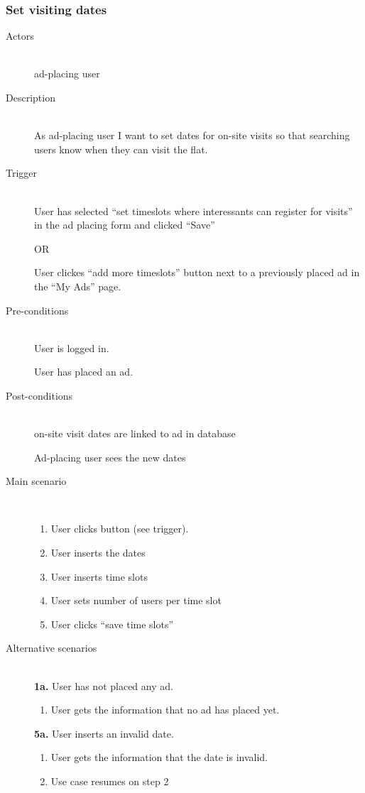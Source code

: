 \documentclass[a4wide]{article}
\begin{document}
\subsubsection{Set visiting dates}
\begin{description}
\item[Actors]\mbox{}\\
ad-placing user

\item[Description]\mbox{}\\
As ad-placing user I want to set dates for on-site visits so that searching users know when they can visit the flat.
\item[Trigger]\mbox{}\\
User has selected “set timeslots where interessants can register for visits” in the ad placing form and clicked  “Save”

OR

User clickes “add more timeslots” button next to a previously placed ad in the “My Ads” page.

\item[Pre-conditions]\mbox{}\\
User is logged in.

User has placed an ad.

\item[Post-conditions]\mbox{}\\
on-site visit dates are linked to ad in database

Ad-placing user sees the new dates

\item[Main scenario]\mbox{}\\
\begin{enumerate}
\item User clicks button (see trigger).
\item User inserts the dates
\item User inserts time slots
\item User sets number of users per time slot
\item User clicks “save time slots”
\end{enumerate}
\item[Alternative scenarios]\mbox{}\\
\textbf{1a.}  User has not placed any ad.
\begin{enumerate}
 \item User gets the information that no ad has placed yet.
\end{enumerate}
\textbf{5a.} User inserts an invalid date.
\begin{enumerate}
\item User gets the information that the date is invalid.
\item Use case resumes on step 2
\end{enumerate}
\end{description}
\end{document}
